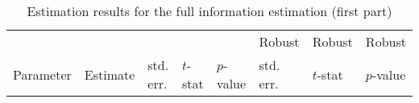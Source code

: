 \documentclass[12pt,a4paper]{article}
\begin{document}
 \begin{sidewaystable}[htb]
\caption{\label{tab:fi}Estimation results for the full information
  estimation (first part)}
\begin{tabular}{lr@{.}lr@{.}lr@{.}lr@{.}lr@{.}lr@{.}lr@{.}l}
                      &   \multicolumn{2}{l}{}    & \multicolumn{2}{l}{} & \multicolumn{2}{l}{}  &     \multicolumn{2}{l}{} &   \multicolumn{2}{l}{Robust}    & \multicolumn{2}{l}{Robust}  &     \multicolumn{2}{l}{Robust}   \\
Parameter      & \multicolumn{2}{l}{Estimate}  &
\multicolumn{2}{l}{std. err.}  &  \multicolumn{2}{l}{$t$-stat}  &   \multicolumn{2}{l}{$p$-value}  &
\multicolumn{2}{l}{std. err.}  &  \multicolumn{2}{l}{$t$-stat}  &   \multicolumn{2}{l}{$p$-value}   \\

\hline


\end{tabular}
\end{sidewaystable}
\end{document}
